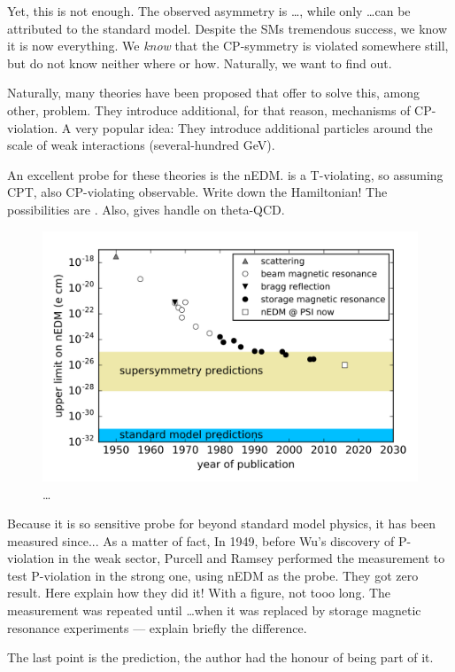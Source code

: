 Yet, this is not enough. \cite{Pospelov2005} The observed asymmetry is \ldots, while only \ldots can be attributed to the standard model. Despite the SMs tremendous success, we know it is now everything. We \emph{know} that the CP-symmetry is violated somewhere still, but do not know neither where or how. Naturally, we want to find out.

Naturally, many theories have been proposed that offer to solve this, among other, problem. They introduce additional, for that reason, mechanisms of CP-violation. A very popular idea: They introduce additional particles around the scale of weak interactions (several-hundred GeV).

An excellent probe for these theories is the nEDM. is a T-violating, so assuming CPT, also CP-violating observable. Write down the Hamiltonian!
The possibilities are \cite{Ellis1989}.
Also, gives handle on theta-QCD.

\begin{figure}
  \centering
  \includegraphics[width=\linewidth]{gfx/introduction/limits.png}
  \caption{\ldots {}  }
  \label{fig:nEDM_limits_history}
\end{figure}

Because it is so sensitive probe for beyond standard model physics, it has been measured since... As a matter of fact, In 1949, before Wu's discovery of P-violation in the weak sector, Purcell and Ramsey performed the measurement to test P-violation in the strong one, using nEDM as the probe. They got zero result. Here explain how they did it! With a figure, not tooo long. The measurement was repeated until \ldots when it was replaced by storage magnetic resonance experiments --- explain briefly the difference.

The last point is the prediction, the author had the honour of being part of it.

